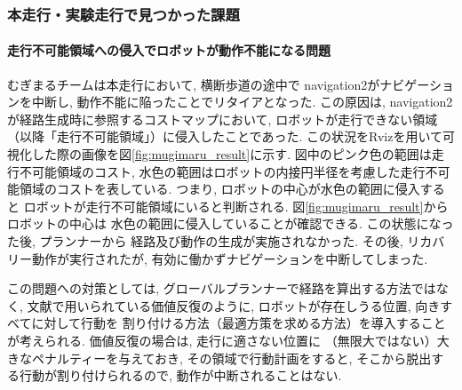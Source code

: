\subsubsection{本走行・実験走行で見つかった課題}
\paragraph{走行不可能領域への侵入でロボットが動作不能になる問題}
むぎまるチームは本走行において, 横断歩道の途中で
navigation2がナビゲーションを中断し, 
動作不能に陥ったことでリタイアとなった. 
この原因は, navigation2が経路生成時に参照するコストマップにおいて, 
ロボットが走行できない領域（以降「走行不可能領域」）に侵入したことであった. 
この状況をRvizを用いて可視化した際の画像を図\ref{fig:mugimaru_result}に示す. 
図中のピンク色の範囲は走行不可能領域のコスト, 
水色の範囲はロボットの内接円半径を考慮した走行不可能領域のコストを表している. 
つまり, ロボットの中心が水色の範囲に侵入すると
ロボットが走行不可能領域にいると判断される. 
図\ref{fig:mugimaru_result}からロボットの中心は
水色の範囲に侵入していることが確認できる. 
この状態になった後, プランナーから
経路及び動作の生成が実施されなかった. 
その後, リカバリー動作が実行されたが, 
有効に働かずナビゲーションを中断してしまった. 

この問題への対策としては, 
グローバルプランナーで経路を算出する方法ではなく, 
文献\cite{ueda2023JRM}で用いられている価値反復のように, 
ロボットが存在しうる位置, 向きすべてに対して行動を
割り付ける方法（最適方策を求める方法）を導入することが考えられる. 
価値反復の場合は, 走行に適さない位置に
（無限大ではない）大きなペナルティーを与えておき, 
その領域で行動計画をすると, 
そこから脱出する行動が割り付けられるので, 
動作が中断されることはない. 




